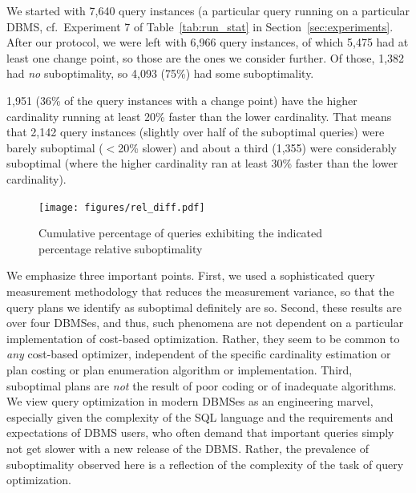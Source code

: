 \documentclass[prodmode,acmtods]{acmsmall}
\begin{document}
We started with 7,640 query instances (a particular query running on a
particular DBMS, cf.~Experiment 7 of Table~\ref{tab:run_stat}
in Section~\ref{sec:experiments}. After our protocol, we were left with
  6,966 query instances, of which 5,475 had at least one change point, so those are
  the ones we consider further. Of those, 1,382 had {\em no} suboptimality, so
4,093 (75\%) had some suboptimality. 

1,951 (36\% of the query instances with a change point) have the higher cardinality
running at least 20\% faster than the lower cardinality. That means that
2,142 query instances (slightly over half of the suboptimal queries) were barely
suboptimal ($<$20\% slower) and about a third (1,355) were considerably
suboptimal (where the higher cardinality ran at least 30\% faster than the
lower cardinality).

\begin{figure}\centering
\texttt{[image: figures/rel\_diff.pdf]}
\caption{Cumulative percentage of queries exhibiting the \hbox{indicated}
  percentage relative suboptimality\label{fig:suboptcumulative}}
\end{figure}

We emphasize three important points. First, we used a sophisticated query
measurement methodology that reduces the measurement variance, so that the
query plans we identify as suboptimal definitely are so. Second, these
results are over four \hbox{DBMSes}, and thus, such phenomena are not dependent on
a particular implementation of cost-based optimization. Rather, they seem to
be common to {\em any} cost-based optimizer, independent of the specific
cardinality \hbox{estimation} or plan costing or plan enumeration algorithm or
implementation. Third, suboptimal plans are {\em not} the result of poor
coding or of inadequate algorithms. We view query optimization in modern
\hbox{DBMSes} as an engineering marvel, especially given the complexity of the SQL
language and the requirements and expectations of \hbox{DBMS} users, who often
demand that important queries simply not get slower with a new release of
the \hbox{DBMS}. Rather, the prevalence of suboptimality observed here is a
reflection of the complexity of the task of query optimization.
\end{document}
